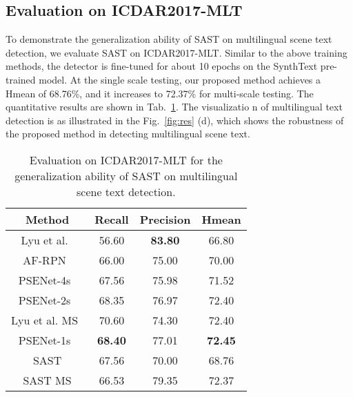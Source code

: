 \documentclass[sigconf]{acmart}
\begin{document}
\subsection{Evaluation on ICDAR2017-MLT}
To demonstrate the generalization ability of SAST on multilingual scene text detection, we evaluate SAST on ICDAR2017-MLT. Similar to the above training methods, the detector is fine-tuned for about 10 epochs on the SynthText pre-trained model. At the single scale testing, our proposed method achieves a Hmean of 68.76\%, and it increases to 72.37\% for multi-scale testing. The quantitative results are shown in Tab.~\ref{tab:ex_icdar17mlt}. The visualizatio n of multilingual text detection is as illustrated in the Fig.~\ref{fig:res} (d), which shows the robustness of the proposed method in detecting multilingual scene text.




\begin{table}
  \caption{Evaluation on ICDAR2017-MLT for the generalization ability of SAST on multilingual scene text detection.}
  \label{tab:ex_icdar17mlt}
  \begin{tabular}{cccc}
    \toprule
      Method & Recall & Precision & Hmean\\
    \midrule
Lyu et al.~\cite{lyu2018multi} &56.60 &\textbf{83.80} &66.80 \\
AF-RPN~\cite{zhong2018anchor} &66.00 &75.00 &70.00 \\
PSENet-4s~\cite{wang2019shape} &67.56 &75.98 &71.52 \\
    PSENet-2s~\cite{wang2019shape} &68.35 &76.97 &72.40 \\
    Lyu et al. MS~\cite{lyu2018multi} &70.60 &74.30 &72.40 \\
    PSENet-1s~\cite{wang2019shape} &\textbf{68.40} &77.01 &\textbf{72.45} \\
\midrule
    SAST     &67.56 	&70.00 	&68.76 \\
    SAST MS &66.53 	&79.35 	&72.37 \\
  \bottomrule
\end{tabular}
\end{table}
\end{document}
